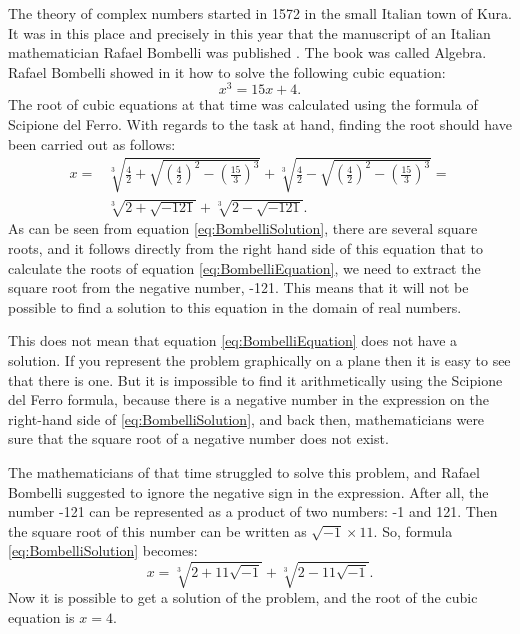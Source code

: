\documentclass[
]{book}
\begin{document}
The theory of complex numbers started in 1572 in the small Italian town of Kura. It was in this place and precisely in this year that the manuscript of an Italian mathematician Rafael Bombelli was published \citep{Bombelli1572}. The book was called Algebra. Rafael Bombelli showed in it how to solve the following cubic equation:
\begin{equation}
    x^3 = 15x + 4 .
    \label{eq:BombelliEquation}
\end{equation}
The root of cubic equations at that time was calculated using the formula of Scipione del Ferro. With regards to the task at hand, finding the root should have been carried out as follows:
\begin{equation}
    \begin{aligned}
    x = & \sqrt[3]{\frac{4}{2}+\sqrt{\left(\frac{4}{2}\right)^2 - \left(\frac{15}{3}\right)^3}} + \sqrt[3]{\frac{4}{2}-\sqrt{\left(\frac{4}{2}\right)^2 - \left(\frac{15}{3}\right)^3}} = \\
        & \sqrt[3]{2+\sqrt{-121}} + \sqrt[3]{2-\sqrt{-121}} .
    \end{aligned}
    \label{eq:BombelliSolution}
\end{equation}
As can be seen from equation \eqref{eq:BombelliSolution}, there are several square roots, and it follows directly from the right hand side of this equation that to calculate the roots of equation \eqref{eq:BombelliEquation}, we need to extract the square root from the negative number, -121. This means that it will not be possible to find a solution to this equation in the domain of real numbers.

This does not mean that equation \eqref{eq:BombelliEquation} does not have a solution. If you represent the problem graphically on a plane then it is easy to see that there is one. But it is impossible to find it arithmetically using the Scipione del Ferro formula, because there is a negative number in the expression on the right-hand side of \eqref{eq:BombelliSolution}, and back then, mathematicians were sure that the square root of a negative number does not exist.

The mathematicians of that time struggled to solve this problem, and Rafael Bombelli suggested to ignore the negative sign in the expression. After all, the number -121 can be represented as a product of two numbers: -1 and 121. Then the square root of this number can be written as \(\sqrt{-1} \times 11\). So, formula \eqref{eq:BombelliSolution} becomes:
\begin{equation}
    x = \sqrt[3]{2+11\sqrt{-1}} + \sqrt[3]{2-11\sqrt{-1}} .
    \label{eq:BombelliSolutionSqrt}
\end{equation}
Now it is possible to get a solution of the problem, and the root of the cubic equation is \(x = 4\).
\end{document}
